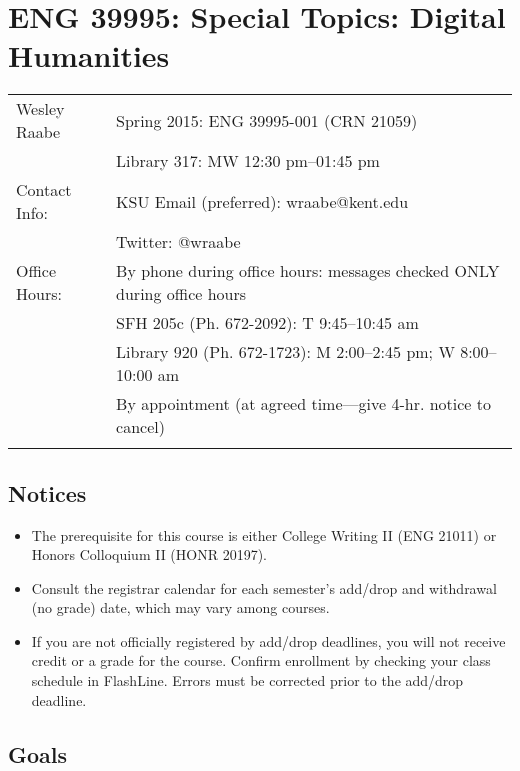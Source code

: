 \documentclass[]{article}
\begin{document}
\section{ENG 39995: Special Topics: Digital
Humanities}\label{eng-39995-special-topics-digital-humanities}

\begin{longtable}[c]{@{}ll@{}}
\toprule\addlinespace
Wesley Raabe & Spring 2015: ENG 39995-001 (CRN 21059)
\\\addlinespace
& Library 317: MW 12:30 pm--01:45 pm
\\\addlinespace
Contact Info: & KSU Email (preferred): wraabe@kent.edu
\\\addlinespace
& Twitter: @wraabe
\\\addlinespace
Office Hours: & By phone during office hours: messages checked ONLY
during office hours
\\\addlinespace
& SFH 205c (Ph. 672-2092): T 9:45--10:45 am
\\\addlinespace
& Library 920 (Ph. 672-1723): M 2:00--2:45 pm; W 8:00--10:00 am
\\\addlinespace
& By appointment (at agreed time---give 4-hr. notice to cancel)
\\\addlinespace
\bottomrule
\end{longtable}

\subsection{Notices}\label{notices}

\begin{itemize}
\itemsep1pt\parskip0pt
\item
  The prerequisite for this course is either College Writing II (ENG
  21011) or Honors Colloquium II (HONR 20197).
\item
  Consult the registrar calendar for each semester's add/drop and
  withdrawal (no grade) date, which may vary among courses.
\item
  If you are not officially registered by add/drop deadlines, you will
  not receive credit or a grade for the course. Confirm enrollment by
  checking your class schedule in FlashLine. Errors must be corrected
  prior to the add/drop deadline.
\end{itemize}

\subsection{Goals}\label{goals}
\end{document}
